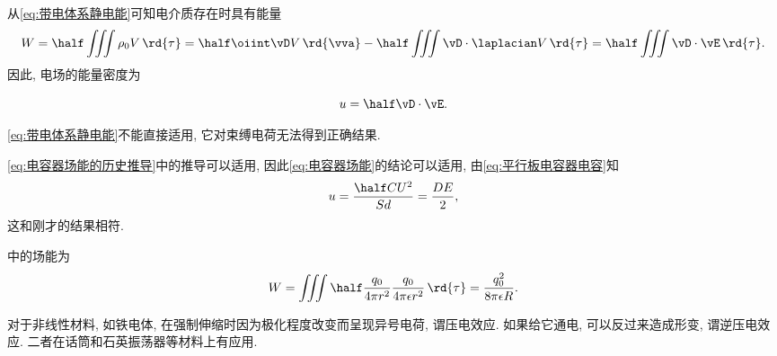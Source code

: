 \documentclass[../Electromagnetism.tex]{subfiles}
\begin{document}
从\eqref{eq:带电体系静电能}可知电介质存在时具有能量
\[ W = \half\iiint \rho_0 V\,\rd{\tau} = \half\oiint \vD V\,\rd{\vva} - \half \iiint \vD\cdot\laplacian V\,\rd{\tau} = \half\iiint \vD\cdot\vE \,\rd{\tau}. \]
因此, 电场的能量密度为
\begin{finale}
	\[ u = \half \vD\cdot\vE. \]
\end{finale}
\begin{pitfall}
	\eqref{eq:带电体系静电能}不能直接适用, 它对束缚电荷无法得到正确结果.
\end{pitfall}
\begin{ex}
	\eqref{eq:电容器场能的历史推导}中的推导可以适用, 因此\eqref{eq:电容器场能}的结论可以适用, 由\eqref{eq:平行板电容器电容}知
	\[ u = \frac{\half CU^2}{Sd} = \frac{DE}{2}, \]
	这和刚才的结果相符.
\end{ex}
\begin{ex}
	中的场能为
	\[ W = \iiint \half \frac{q_0}{4\pi r^2}\frac{q_0}{4\pi \epsilon r^2} \,\rd{\tau} = \frac{q_0^2}{8\pi\epsilon R}. \]
\end{ex}
\begin{remark}
	对于非线性材料, 如铁电体, 在强制伸缩时因为极化程度改变而呈现异号电荷, 谓压电效应. 如果给它通电, 可以反过来造成形变, 谓逆压电效应. 二者在话筒和石英振荡器等材料上有应用.
\end{remark}



\end{document}
